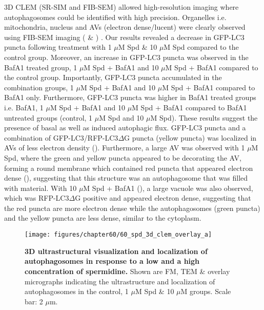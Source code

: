 3D CLEM (SR-SIM and FIB-SEM) allowed high-resolution imaging where autophagosomes could be identified with high precision. Organelles i.e. mitochondria, nucleus and AVs (electron dense/lucent) were clearly observed using FIB-SEM imaging ( \& ) . Our results revealed a decrease in GFP-LC3 puncta following treatment with 1 $\mu$M Spd \& 10 $\mu$M Spd compared to the control group. Moreover, an increase in GFP-LC3 puncta was observed in the BafA1 treated group, 1 $\mu$M Spd + BafA1 and 10 $\mu$M Spd + BafA1 compared to the control group. Importantly, GFP-LC3 puncta accumulated in the combination groups, 1 $\mu$M Spd + BafA1 and 10 $\mu$M Spd + BafA1 compared to BafA1 only. Furthermore, GFP-LC3 puncta was higher in BafA1 treated groups i.e. BafA1, 1 $\mu$M Spd + BafA1 and 10 $\mu$M Spd + BafA1 compared to BafA1 untreated groups (control, 1 $\mu$M Spd and 10 $\mu$M Spd). These results suggest the presence of basal as well as induced autophagic flux. GFP-LC3 puncta and a combination of GFP-LC3/RFP-LC3$\Delta$G puncta (yellow puncta) was localized in AVs of less electron density (). Furthermore, a large AV was observed with 1 $\mu$M Spd, where the green and yellow puncta appeared to be decorating the AV, forming a round membrane which contained red puncta that appeared electron dense (), suggesting that this structure was an autophagosome that was filled with material. With 10 $\mu$M Spd + BafA1 (), a large vacuole was also observed, which was RFP-LC3$\Delta$G positive and appeared electron dense, suggesting that the red puncta are more electron dense while the autophagosomes (green puncta) and the yellow puncta are less dense, similar to the cytoplasm. 

\begin{landscape}
\begin{figure}[!htbp]
\center
 \texttt{[image: figures/chapter60/60\_spd\_3d\_clem\_overlay\_a]}
 \caption[3D ultrastructural visualization and localization of autophagosomes in response to a low and a high concentration of spermidine]{\textbf{3D ultrastructural visualization and localization of autophagosomes in response to a low and a high concentration of spermidine.} Shown are FM, TEM \& overlay micrographs indicating the ultrastructure and localization of autophagosomes in the control, 1 $\mu$M Spd \& 10 $\mu$M groups. Scale bar: 2 $\mu$m.}
 \label{fig:60_spd_3d_clem_overlay_a}
\end{figure} 
\end{landscape}

